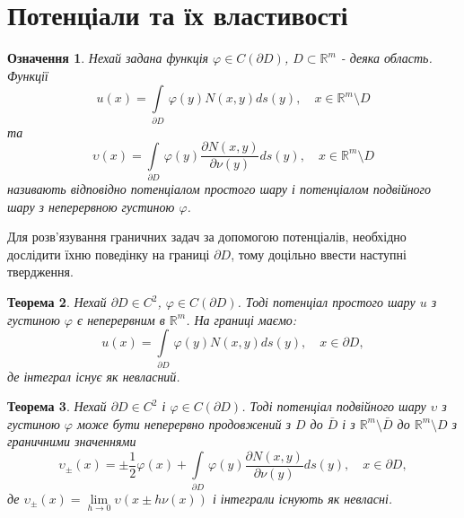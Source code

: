 \documentclass[a4 paper,12pt,ukrainian]{report}
\newtheorem{theorem}{\textbf{Теорема}}[chapter]
\newtheorem{determination}[theorem]{\textbf{Означення}}
\begin{document}


\section{Потенціали та їх властивості}
\begin{determination}
Нехай задана функція $\varphi\in C(\partial D)$, $D\subset\mathbb{R}^m$ - деяка область. Функції
\begin{equation*}
u(x) = \int\limits_{\partial{D}} \, \varphi(y)N(x,y) ds(y) , \quad x \in \mathbb{R}^m\setminus D
\end{equation*}
та
\begin{equation*}
\upsilon(x) = \int\limits_{\partial{D}} \, \varphi(y)\frac{\partial N(x,y)}{\partial\nu(y)} ds(y) , \quad x \in \mathbb{R}^m\setminus D
\end{equation*}
називають відповідно потенціалом простого шару і потенціалом подвійного шару з неперервною густиною $\varphi$.
\end{determination}
\hspace*{\parindent}Для розв'язування граничних задач за допомогою потенціалів, необхідно дослідити їхню поведінку на границі $\partial{D}$, тому доцільно ввести наступні твердження.
\begin{theorem}
Нехай $\partial{D}\in C^2$, $\varphi\in C(\partial{D})$. Тоді потенціал простого шару $u$ з густиною $\varphi$ є неперервним в $\mathbb{R}^m$. На границі маємо:
\begin{equation*}
u(x) = \int\limits_{\partial{D}} \, \varphi(y)N(x,y) ds(y) , \quad x \in \partial D,
\end{equation*}
де інтеграл існує як невласний.
\end{theorem}
\begin{theorem}
Нехай $\partial D\in C^2$ і $\varphi\in C(\partial D)$. Тоді потенціал подвійного шару $\upsilon$ з густиною $\varphi$ може бути неперервно продовжений з $D$ до $\bar{D}$ і з $\mathbb{R}^m\setminus\bar{D}$ до $\mathbb{R}^m\setminus D$ з граничними значеннями
\begin{equation*}
\upsilon_\pm(x) = \pm\frac{1}{2}\varphi(x)+\int\limits_{\partial{D}} \, \varphi(y)\frac{\partial N(x,y)}{\partial\nu(y)} ds(y) , \quad x \in \partial D,
\end{equation*}
де $\upsilon_\pm(x)=\lim\limits_{h \to 0}\upsilon(x\pm h\nu(x))$ і інтеграли існують як невласні. 
\end{theorem}
\end{document}
